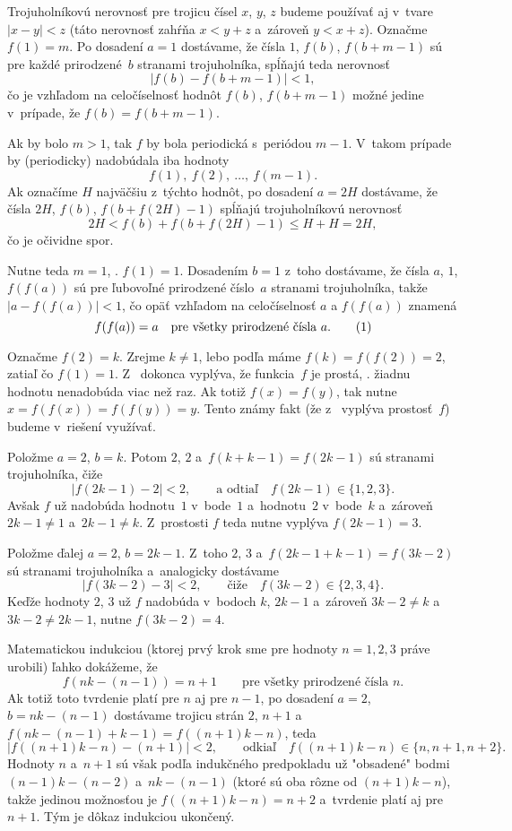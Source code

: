{%
Trojuholníkovú nerovnosť pre trojicu čísel $x$, $y$, $z$ budeme používať aj v~tvare $|x-y|<z$ (táto nerovnosť zahŕňa $x<y+z$ a~zároveň $y<x+z$). Označme $f(1)=m$. Po dosadení $a=1$ dostávame, že čísla $1$, $f(b)$, $f({b+m-1})$ sú pre každé prirodzené~$b$ stranami trojuholníka, spĺňajú teda nerovnosť
$$
|f(b)-f(b+m-1)|<1,
$$
čo je vzhľadom na celočíselnosť hodnôt $f(b)$, $f(b+m-1)$ možné jedine v~prípade, že $f(b)=f(b+m-1)$.

Ak by bolo $m>1$, tak $f$ by bola periodická s~periódou $m-1$. V~takom prípade by (periodicky) nadobúdala iba hodnoty
$$
f(1),\ f(2),\ \dots,\ f(m-1).
$$
Ak označíme $H$ najväčšiu z~týchto hodnôt, po dosadení $a=2H$ dostávame, že čísla $2H$, $f(b)$, $f(b+f(2H)-1)$ spĺňajú trojuholníkovú nerovnosť
$$
2H<f(b)+f(b+f(2H)-1)\le H+H=2H,
$$
čo je očividne spor.

Nutne teda $m=1$, \tj. $f(1)=1$. Dosadením $b=1$ z~toho dostávame, že čísla $a$, $1$, $f(f(a))$ sú pre ľubovoľné prirodzené číslo~$a$ stranami trojuholníka, takže $|a-f(f(a))|<1$, čo opäť vzhľadom na celočíselnosť $a$ a $f(f(a))$ znamená
$$
f(f(a))=a\quad\text{pre všetky prirodzené čísla $a$.}
\tag1
$$

Označme $f(2)=k$. Zrejme $k\ne1$, lebo podľa  máme $f(k)=f(f(2))=2$, zatiaľ čo $f(1)=1$. Z~ dokonca vyplýva, že funkcia~$f$ je prostá, \tj. žiadnu hodnotu nenadobúda viac než raz. Ak totiž $f(x)=f(y)$, tak nutne $x=f(f(x))=f(f(y))=y$. Tento známy fakt (že z~ vyplýva prostosť~$f$) budeme v~riešení využívať.

Položme $a=2$, $b=k$. Potom $2$, $2$ a~$f(k+k-1)=f(2k-1)$ sú stranami trojuholníka, čiže
$$
|f(2k-1)-2|<2,\qquad\text{a odtiaľ}\quad f(2k-1)\in\{1,2,3\}.
$$
Avšak $f$ už nadobúda hodnotu~$1$ v~bode~$1$ a~hodnotu~$2$ v~bode~$k$ a~zároveň $2k-1\ne1$ a~$2k-1\ne k$. Z~prostosti $f$ teda nutne vyplýva $f(2k-1)=3$.

Položme ďalej $a=2$, $b=2k-1$. Z~toho $2$, $3$ a~$f(2k-1+k-1)=f(3k-2)$ sú stranami trojuholníka a~analogicky dostávame
$$
|f(3k-2)-3|<2,\qquad\text{čiže}\quad f(3k-2)\in\{2,3,4\}.
$$
Keďže hodnoty $2$, $3$ už $f$ nadobúda v~bodoch $k$, $2k-1$ a~zároveň $3k-2\ne k$ a~$3k-2\ne2k-1$, nutne $f(3k-2)=4$.

Matematickou indukciou (ktorej prvý krok sme pre hodnoty $n=1,2,3$ práve urobili) ľahko dokážeme, že
$$
f(nk-(n-1))=n+1\qquad\text{pre všetky prirodzené čísla $n$}.
$$
Ak totiž toto tvrdenie platí pre $n$ aj pre $n-1$, po dosadení $a=2$, $b=nk-(n-1)$ dostávame trojicu strán $2$, $n+1$ a~$f(nk-(n-1)+k-1)=f((n+1)k-n)$, teda
$$
|f((n+1)k-n)-(n+1)|<2,\qquad\text{odkiaľ}\quad f((n+1)k-n)\in\{n,n+1,n+2\}.
$$
Hodnoty $n$ a~$n+1$ sú však podľa indukčného predpokladu už "obsadené" bodmi ${(n-1)k}-{(n-2)}$ a~$nk-(n-1)$ (ktoré sú oba rôzne od $(n+1)k-n$), takže jedinou možnosťou je $f((n+1)k-n)=n+2$ a~tvrdenie platí aj pre $n+1$. Tým je dôkaz indukciou ukončený.

}
